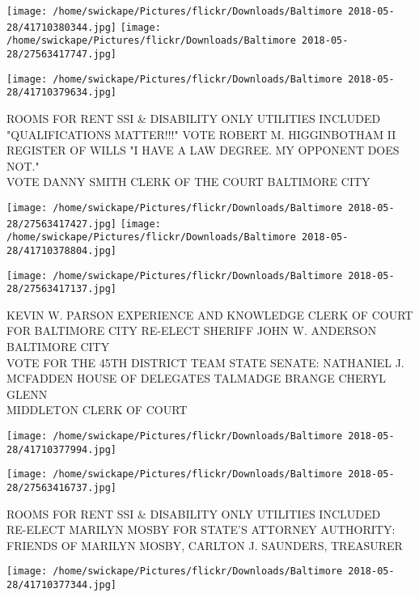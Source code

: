 \documentclass[10pt,letterpaper]{article}
\begin{document}
\texttt{[image: /home/swickape/Pictures/flickr/Downloads/Baltimore 2018-05-28/41710380344.jpg]}
\texttt{[image: /home/swickape/Pictures/flickr/Downloads/Baltimore 2018-05-28/27563417747.jpg]}

\vspace{0.25in}
\texttt{[image: /home/swickape/Pictures/flickr/Downloads/Baltimore 2018-05-28/41710379634.jpg]}

ROOMS FOR RENT SSI \& DISABILITY ONLY UTILITIES INCLUDED\\
"QUALIFICATIONS MATTER!!!" VOTE ROBERT M. HIGGINBOTHAM II REGISTER OF WILLS "I HAVE A LAW DEGREE.  MY OPPONENT DOES NOT."\\
VOTE DANNY SMITH CLERK OF THE COURT BALTIMORE CITY\\
\pagebreak

\texttt{[image: /home/swickape/Pictures/flickr/Downloads/Baltimore 2018-05-28/27563417427.jpg]}
\texttt{[image: /home/swickape/Pictures/flickr/Downloads/Baltimore 2018-05-28/41710378804.jpg]}

\vspace{0.25in}
\texttt{[image: /home/swickape/Pictures/flickr/Downloads/Baltimore 2018-05-28/27563417137.jpg]}

KEVIN W. PARSON EXPERIENCE AND KNOWLEDGE CLERK OF COURT FOR BALTIMORE CITY RE{-}ELECT SHERIFF JOHN W. ANDERSON BALTIMORE CITY\\
VOTE FOR THE 45TH DISTRICT TEAM STATE SENATE: NATHANIEL J. MCFADDEN HOUSE OF DELEGATES TALMADGE BRANGE CHERYL GLENN\\
MIDDLETON CLERK OF COURT\\
\pagebreak

\texttt{[image: /home/swickape/Pictures/flickr/Downloads/Baltimore 2018-05-28/41710377994.jpg]}

\vspace{0.25in}
\texttt{[image: /home/swickape/Pictures/flickr/Downloads/Baltimore 2018-05-28/27563416737.jpg]}

ROOMS FOR RENT SSI \& DISABILITY ONLY UTILITIES INCLUDED\\
RE{-}ELECT MARILYN MOSBY FOR STATE'S ATTORNEY AUTHORITY: FRIENDS OF MARILYN MOSBY, CARLTON J. SAUNDERS, TREASURER\\
\pagebreak

\texttt{[image: /home/swickape/Pictures/flickr/Downloads/Baltimore 2018-05-28/41710377344.jpg]}
\end{document}

